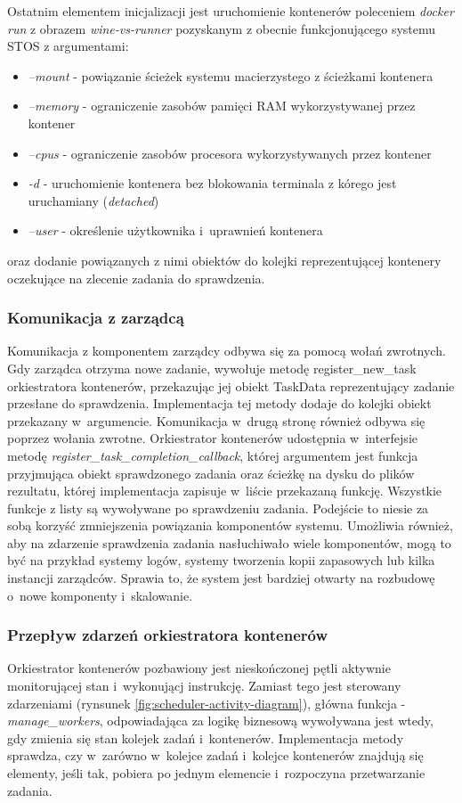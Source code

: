 Ostatnim elementem inicjalizacji jest uruchomienie kontenerów poleceniem \textit{docker run} z obrazem \textit{wine-vs-runner} pozyskanym z obecnie funkcjonującego systemu STOS z argumentami:
\begin{itemize}
    \item \textit{--mount} - powiązanie ścieżek systemu macierzystego z ścieżkami kontenera
    \item \textit{--memory} - ograniczenie zasobów pamięci RAM wykorzystywanej przez kontener
    \item \textit{--cpus} - ograniczenie zasobów procesora wykorzystywanych przez kontener
    \item \textit{-d} - uruchomienie kontenera bez blokowania terminala z kórego jest uruchamiany (\textit{detached})
    \item \textit{--user} - określenie użytkownika i~uprawnień kontenera
\end{itemize}
oraz dodanie powiązanych z nimi obiektów do kolejki reprezentującej kontenery oczekujące na zlecenie zadania do sprawdzenia.

\subsubsection{Komunikacja z zarządcą}
Komunikacja z komponentem zarządcy odbywa się za pomocą wołań zwrotnych. Gdy zarządca otrzyma nowe zadanie, wywołuje metodę register\_new\_task orkiestratora kontenerów, przekazując jej obiekt TaskData reprezentujący zadanie przesłane do sprawdzenia. Implementacja tej metody dodaje do kolejki obiekt przekazany w~argumencie. Komunikacja w~drugą stronę również odbywa się poprzez wołania zwrotne. Orkiestrator kontenerów udostępnia w~interfejsie metodę \textit{register\_task\_completion\_callback}, której argumentem jest funkcja przyjmująca obiekt sprawdzonego zadania oraz ścieżkę na dysku do plików rezultatu, której implementacja zapisuje w~liście przekazaną funkcję. Wszystkie funkcje z listy są wywoływane po sprawdzeniu zadania. Podejście to niesie za sobą korzyść zmniejszenia powiązania komponentów systemu. Umożliwia również, aby na zdarzenie sprawdzenia zadania nasłuchiwało wiele komponentów, mogą to być na przykład systemy logów, systemy tworzenia kopii zapasowych lub kilka instancji zarządców. Sprawia to, że system jest bardziej otwarty na rozbudowę o~nowe komponenty i~skalowanie.

\subsubsection{Przepływ zdarzeń orkiestratora kontenerów}
Orkiestrator kontenerów pozbawiony jest nieskończonej pętli aktywnie monitorującej stan i~wykonującj instrukcję. Zamiast tego jest sterowany zdarzeniami (rynsunek \ref{fig:scheduler-activity-diagram}), główna funkcja - \textit{manage\_workers}, odpowiadająca za logikę biznesową wywoływana jest wtedy, gdy zmienia się stan kolejek zadań i~kontenerów. Implementacja metody sprawdza, czy w~zarówno w~kolejce zadań i~kolejce kontenerów znajdują się elementy, jeśli tak, pobiera po jednym elemencie i~rozpoczyna przetwarzanie zadania.

